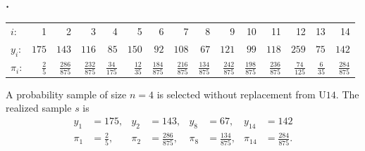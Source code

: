 \documentclass{my_eth_beamer}
\numberwithin{equation}{section}
\begin{document}
\begin{frame}
    \frametitle{\insertsectionnumber.\insertsubsectionnumber~\insertsubsection}
    \begin{Bsp}\label{ex:unequal_oracle}
        \begin{center}
        {\scriptsize
        \begin{tabularx}{\textwidth}{Xrrrrrrrrrrrrrr}
            \addlinespace
            \footnotesize{$i$:} & 1 & 2 & 3 & 4 & 5 & 6 & 7 & 8 & 9 & 10 & 11 &
            12 & 13 & 14\\
            \addlinespace
            \midrule
            \addlinespace
            \footnotesize{$y_i$:} & $175$ & $143$ & $116$ & $85$ & $150$ & $92$
            & $108$ & $67$ & $121$ & $99$ & $118$ & $259$ & $75$ & $142$\\
            \addlinespace\addlinespace
            \footnotesize{$\pi_i$:} & $\displaystyle{\frac{2}{5}}$ &
            $\displaystyle{\frac{286}{875}}$ & $\displaystyle{\frac{232}{875}}$
            & $\displaystyle{\frac{34}{175}}$ & $\displaystyle{\frac{12}{35}}$
            & $\displaystyle{\frac{184}{875}}$ &
            $\displaystyle{\frac{216}{875}}$ & $\displaystyle{\frac{134}{875}}$
            & $\displaystyle{\frac{242}{875}}$ &
            $\displaystyle{\frac{198}{875}}$ & $\displaystyle{\frac{236}{875}}$
            & $\displaystyle{\frac{74}{125}}$ & $\displaystyle{\frac{6}{35}}$ &
            $\displaystyle{\frac{284}{875}}$ \\
        \end{tabularx}
        }
        \end{center}
        \vspace{0.5em}
        A probability sample of size $n=4$ is selected without replacement
        from U$14$. The \alert{realized} sample $s$ is
        \begin{align*}
            y_1 &= 175,& y_2 &= 143,& y_8 &= 67,& y_{14} &= 142\\
            \pi_1 &= \frac{2}{5},& \pi_{2} &= \frac{286}{875},&
            \pi_{8} &= \frac{134}{875},& \pi_{14} &= \frac{284}{875}.
        \end{align*}
    \end{Bsp}
\end{frame}
\end{document}
